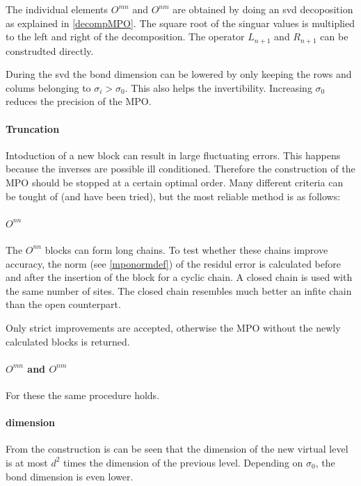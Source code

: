 The individual elements $O^{m n }$ and $O^{n m} $ are obtained by doing an svd decoposition as explained in \cref{decompMPO}. The square root of the singuar values is multiplied to the left and right of the decomposition. The operator $L_{n+1}$ and $R_{n+1}$ can be construdted directly. 


During the svd the bond dimension can be lowered by only keeping the rows and colums belonging to $\sigma_i > \sigma_0$. This also helps the invertibility. Increasing $\sigma_0$ reduces the precision of the MPO.

\paragraph{Truncation}

Intoduction of a new block can result in large fluctuating errors. This happens because the inverses are possible ill conditioned. Therefore the construction of the MPO should be stopped at a certain optimal order. Many different criteria can be tought of (and have been tried), but the most reliable method is as follows:

\paragraph{ \( O^{n n} \)}

The \( O^{n n} \) blocks can form long chains. To test whether these chains improve accuracy, the norm (see \cref{mponormdef}) of the residul error is calculated before and after the insertion of the block for a cyclic chain. A closed chain is used with the same number of sites. The closed chain resembles much better an infite chain than the open counterpart.

Only strict improvements are accepted, otherwise the MPO without the newly calculated blocks is returned.

\paragraph{$O^{m n}$ and $O^{n m}$ } For these the same procedure holds.

\paragraph{dimension}

From the construction is can be seen that  the dimension of the new virtual level is at most $d^2$ times the dimension of the previous level. Depending on $\sigma_0$, the bond dimension is even lower.

